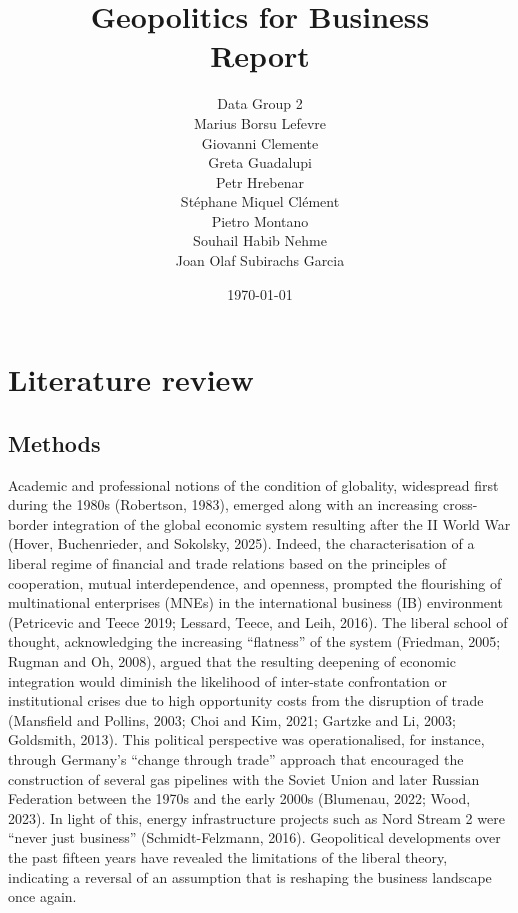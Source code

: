 \documentclass[12pt,a4paper]{article}
\title{Geopolitics for Business \\ Report}
\author{
    Data Group 2 \\[2ex]
    \normalsize Marius Borsu Lefevre \\
    \normalsize Giovanni Clemente \\
    \normalsize Greta Guadalupi \\
    \normalsize Petr Hrebenar \\
    \normalsize Stéphane Miquel Clément \\
    \normalsize Pietro Montano \\
    \normalsize Souhail Habib Nehme \\
    \normalsize Joan Olaf Subirachs Garcia
}
\date{\today}
\begin{document}
\maketitle
\newpage

\section{Literature review}
\subsection{Methods}
Academic and professional notions of the condition of globality, widespread first during the 1980s (Robertson, 1983), emerged along with an increasing cross-border integration of the global economic system resulting after the II World War (Hover, Buchenrieder, and Sokolsky, 2025). Indeed, the characterisation of a liberal regime of financial and trade relations based on the principles of cooperation, mutual interdependence, and openness, prompted the flourishing of multinational enterprises (MNEs) in the international business (IB) environment (Petricevic and Teece 2019; Lessard, Teece, and Leih, 2016). The liberal school of thought, acknowledging the increasing “flatness” of the system (Friedman, 2005; Rugman and Oh, 2008), argued that the resulting deepening of economic integration would diminish the likelihood of inter-state confrontation or institutional crises due to high opportunity costs from the disruption of trade (Mansfield and Pollins, 2003; Choi and Kim, 2021; Gartzke and Li, 2003; Goldsmith, 2013). This political perspective was operationalised, for instance, through Germany’s “change through trade” approach that encouraged the construction of several gas pipelines with the Soviet Union and later Russian Federation between the 1970s and the early 2000s (Blumenau, 2022; Wood, 2023). In light of this, energy infrastructure projects such as Nord Stream 2 were “never just business” (Schmidt-Felzmann, 2016). Geopolitical developments over the past fifteen years have revealed the limitations of the liberal theory, indicating a reversal of an assumption that is reshaping the business landscape once again. 
\end{document}
